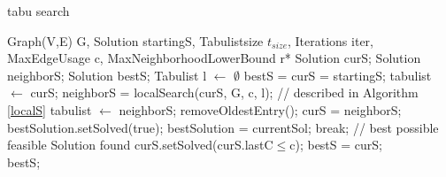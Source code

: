 \documentclass [12pt]{article}
\begin{document}
\begin {algorithm} [H]
\caption {tabu search}
\label {tabusa}
\begin {algorithmic} [3]
\Require Graph(V,E) G, Solution startingS, Tabulistsize $t_{size}$, Iterations iter, MaxEdgeUsage c, MaxNeighborhoodLowerBound r*
\State Solution curS;
\State Solution neighborS;
\State Solution bestS;
\State Tabulist l $\gets$ $\emptyset$
\State bestS = curS = startingS;
\State tabulist $\gets$ curS;
\State  neighborS = localSearch(curS, G, c, l); // described in Algorithm \ref{localS}
\State  tabulist $\gets$ neighborS;
\State removeOldestEntry();
\EndIf
\State  curS = neighborS;
\State bestSolution.setSolved(true);
\State bestSolution = currentSol;
\State break; // best possible feasible Solution found
\EndIf
\EndIf  
{}
\State curS.setSolved(curS.lastC$\leq$c);
\State bestS = curS;
\EndIf 
\EndFor\\
\Return bestS;
\end {algorithmic}
\end {algorithm}
\end{document}
